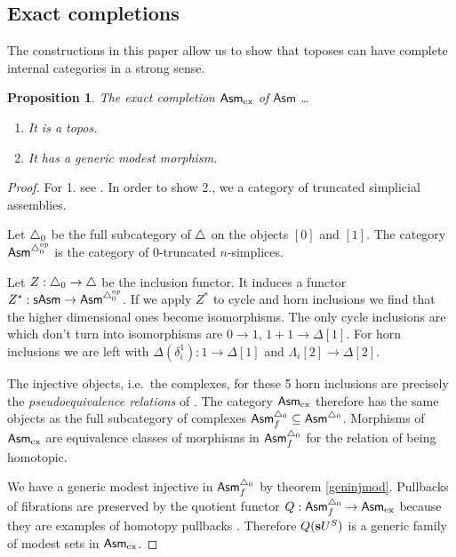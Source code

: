 \documentclass{amsart}
\theoremstyle{plain}
\newtheorem{prop}[theorem]{Proposition}
\theoremstyle{definition}
\newcommand\ri{^*}
\newcommand\Asm{\mathsf{Asm}}
\begin{document}
\newcommand\ex{_{\rm ex}}
\subsection{Exact completions}
The constructions in this paper allow us to show that toposes can have complete internal categories in a strong sense.

\begin{prop} The exact completion $\Asm\ex$ of $\Asm$ \dots
\begin{enumerate}
\item It is a topos. 
\item It has a generic modest morphism.
\end{enumerate}
\end{prop}

\begin{proof}
For 1. see \cite{MR1981211}. In order to show 2., we a category of truncated simplicial assemblies.

Let ${\mathord{\triangle}}_0$ be the full subcategory of ${\mathord{\triangle}}$ on the objects $[0]$ and $[1]$. The category $\Asm^{\simcat_0\dual}$ is the category of $0$-truncated $n$-simplices.

Let $Z:{\mathord{\triangle}}_0\to{\mathord{\triangle}}$ be the inclusion functor. It induces a functor $Z\ri:\sAsm \to \Asm^{\simcat_0\dual}$. If we apply $Z\ri$ to cycle and horn inclusions we find that the higher dimensional ones become isomorphisms. The only cycle inclusions are which don't turn into isomorphisms are $0\to 1$, $1+1 \to \Delta[1]$. For horn inclusions we are left with $\Delta(\delta^1_i):1\to \Delta[1]$ and $\Lambda_i[2] \to \Delta[2]$.

The injective objects, i.e.\ the complexes, for these 5 horn inclusions are precisely the \emph{pseudoequivalence relations} of \cite{MR1600009}. The category $\Asm\ex$ therefore has the same objects as the full subcategory of complexes $\Asm^{\simcat_0}_f\subseteq \Asm^{\simcat_0}$. Morphisms of $\Asm\ex$ are equivalence classes of morphisms in $\Asm^{\simcat_0}_f$ for the relation of being homotopic. 

We have a generic modest injective in $\Asm^{\simcat_0}_f$ by theorem \ref{geninjmod}. Pullbacks of fibrations are preserved by the quotient functor $Q:\Asm^{\simcat_0}_f \to\Asm\ex$ because they are examples of homotopy pullbacks \cite{GJSHT}. Therefore $Q(\mathbf{s} U^S)$ is a generic family of modest sets in $\Asm\ex$.
\end{proof}
\end{document}
